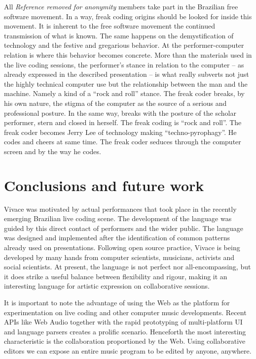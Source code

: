 \documentclass[letterpaper, 12pt]{article}
\begin{document}
All \textit{Reference removed for anonymity} members take part in the Brazilian
free software movement. In a way, freak coding origins should be
looked for inside this movement. It is inherent to the free software
movement the continued transmission of what is known. The same happens
on the demystification of technology and the festive and gregarious
behavior. At the performer-computer relation is where this behavior
becomes concrete. More than the materials used in the live coding
sessions, the performer's stance in relation to the computer -- as
already expressed in the described presentation -- is what really
subverts not just the highly technical computer use but the
relationship between the man and the machine. Namely a kind of a
``rock and roll'' stance. The freak coder breaks, by his own nature,
the stigma of the computer as the source of a serious and professional
posture. In the same way, breaks with the posture of the scholar
performer, stern and closed in herself. The freak coding is ``rock and
roll''. The freak coder becomes Jerry Lee of technology making
``techno-pyrophagy''. He codes and cheers at same time. The freak
coder seduces through the computer screen and by the way he codes.

\section{Conclusions and future work}

Vivace was motivated by actual performances that took place in the
recently emerging Brazilian live coding scene. The development of the
language was guided by this direct contact of performers and the wider
public. The language was designed and implemented after the
identification of common patterns already used on
presentations. Following open source practice, Vivace is being
developed by many hands from computer scientists, musicians, activists
and social scientists. At present, the language is not perfect nor
all-encompassing, but it does strike a useful balance between
flexibility and rigour, making it an interesting language for artistic
expression on collaborative sessions.

It is important to note the advantage of using the Web as the platform
for experimentation on live coding and other computer music
developments. Recent APIs like Web Audio together with the rapid
prototyping of multi-platform UI and language parsers creates a
prolific scenario. Henceforth the most interesting characteristic is
the collaboration proportioned by the Web. Using collaborative editors
we can expose an entire music program to be edited by anyone,
anywhere.
\end{document}
